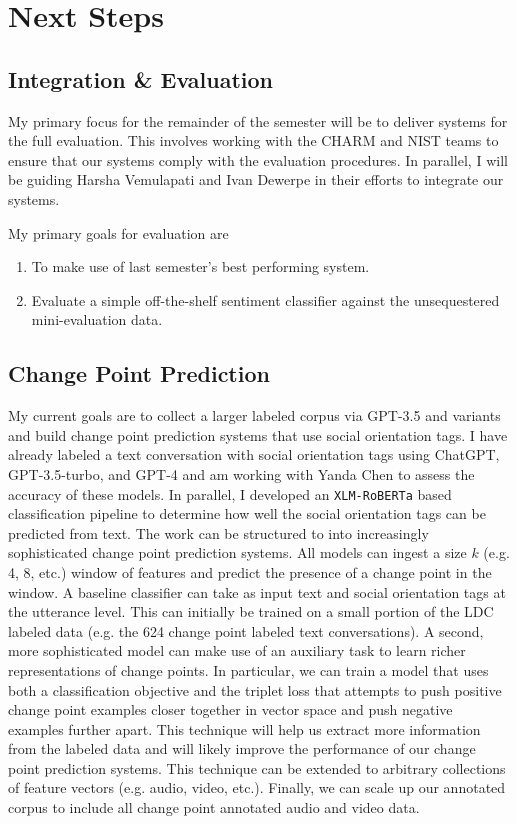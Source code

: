 \documentclass[12pt]{article}
\begin{document}
\section{Next Steps}
\subsection{Integration \& Evaluation} My primary focus for the remainder of the semester will be to deliver systems for the full evaluation. This involves working with the CHARM and NIST teams to ensure that our systems comply with the evaluation procedures. In parallel, I will be guiding Harsha Vemulapati and Ivan Dewerpe in their efforts to integrate our systems.

My primary goals for evaluation are
\begin{enumerate}
    \item To make use of last semester's best performing system.
    \item Evaluate a simple off-the-shelf sentiment classifier against the unsequestered mini-evaluation data.  
\end{enumerate}

\subsection{Change Point Prediction} My current goals are to collect a larger labeled corpus via GPT-3.5 and variants and build change point prediction systems that use social orientation tags. I have already labeled a text conversation with social orientation tags using ChatGPT, GPT-3.5-turbo, and GPT-4 and am working with Yanda Chen to assess the accuracy of these models. In parallel, I developed an \verb|XLM-RoBERTa| \cite{conneau2020unsupervised} based classification pipeline to determine how well the social orientation tags can be predicted from text. The work can be structured to into increasingly sophisticated change point prediction systems. All models can ingest a size $k$ (e.g. 4, 8, etc.) window of features and predict the presence of a change point in the window. A baseline classifier can take as input text and social orientation tags at the utterance level. This can initially be trained on a small portion of the LDC labeled data (e.g. the 624 change point labeled text conversations). A second, more sophisticated model can make use of an auxiliary task to learn richer representations of change points. In particular, we can train a model that uses both a classification objective and the triplet loss \cite{Schroff_2015} that attempts to push positive change point examples closer together in vector space and push negative examples further apart. This technique will help us extract more information from the labeled data and will likely improve the performance of our change point prediction systems. This technique can be extended to arbitrary collections of feature vectors (e.g. audio, video, etc.). Finally, we can scale up our annotated corpus to include all change point annotated audio and video data.

\printbibliography
\end{document}
